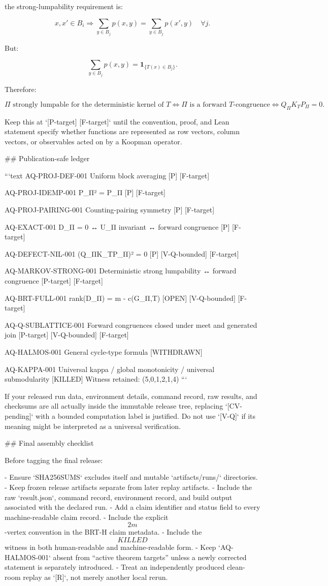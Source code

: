 the strong-lumpability requirement is:

$$
x,x'\in B_i
\Longrightarrow
\sum_{y\in B_j}p(x,y)
=
\sum_{y\in B_j}p(x',y)
\quad\forall j.
$$

But:

$$
\sum_{y\in B_j}p(x,y)
=
\mathbf 1_{\{T(x)\in B_j\}}.
$$

Therefore:

$$
\boxed{
\Pi\text{ strongly lumpable for the deterministic kernel of }T
\iff
\Pi\text{ is a forward }T\text{-congruence}
\iff
Q_\Pi K_TP_\Pi=0.
}
$$

Keep this at `[P-target] [F-target]` until the convention, proof, and Lean statement specify whether functions are represented as row vectors, column vectors, or observables acted on by a Koopman operator.

## Publication-safe ledger

```text
AQ-PROJ-DEF-001
Uniform block averaging
[P] [F-target]

AQ-PROJ-IDEMP-001
P_Π² = P_Π
[P] [F-target]

AQ-PROJ-PAIRING-001
Counting-pairing symmetry
[P] [F-target]

AQ-EXACT-001
D_Π = 0 ↔ U_Π invariant ↔ forward congruence
[P] [F-target]

AQ-DEFECT-NIL-001
(Q_ΠK_TP_Π)² = 0
[P] [V-Q-bounded] [F-target]

AQ-MARKOV-STRONG-001
Deterministic strong lumpability ↔ forward congruence
[P-target] [F-target]

AQ-BRT-FULL-001
rank(D_Π) = m - c(G_{Π,T})
[OPEN] [V-Q-bounded] [F-target]

AQ-Q-SUBLATTICE-001
Forward congruences closed under meet and generated join
[P-target] [V-Q-bounded] [F-target]

AQ-HALMOS-001
General cycle-type formula
[WITHDRAWN]

AQ-KAPPA-001
Universal kappa / global monotonicity / universal submodularity
[KILLED]
Witness retained: (5,0,1,2,1,4)
```

If your released run data, environment details, command record, raw results, and checksums are all actually inside the immutable release tree, replacing `[CV-pending]` with a bounded computation label is justified. Do not use `[V-Q]` if its meaning might be interpreted as a universal verification.

## Final assembly checklist

Before tagging the final release:

- Ensure `SHA256SUMS` excludes itself and mutable `artifacts/runs/` directories.
- Keep frozen release artifacts separate from later replay artifacts.
- Include the raw `result.json`, command record, environment record, and build output associated with the declared run.
- Add a claim identifier and status field to every machine-readable claim record.
- Include the explicit $$2m$$-vertex convention in the BRT-H claim metadata.
- Include the $$KILLED$$ witness in both human-readable and machine-readable form.
- Keep `AQ-HALMOS-001` absent from “active theorem targets” unless a newly corrected statement is separately introduced.
- Treat an independently produced clean-room replay as `[R]`, not merely another local rerun.

